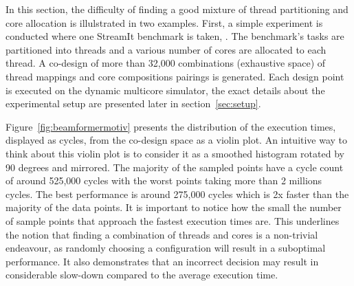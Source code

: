 In this section, the difficulty of finding a good mixture of thread partitioning and core allocation is illulstrated in two examples.
First, a simple experiment is conducted where one StreamIt benchmark is taken, .
The benchmark's tasks are partitioned into threads and a various number of cores are allocated to each thread.
A co-design of more than 32,000 combinations (exhaustive space) of thread mappings and core compositions pairings is generated.
Each design point is executed on the dynamic multicore simulator, the exact details about the experimental setup are presented later in section~\ref{sec:setup}.

Figure~\ref{fig:beamformermotiv} presents the distribution of the execution times, displayed as cycles, from the co-design space as a violin plot.
An intuitive way to think about this violin plot is to consider it as a smoothed histogram rotated by 90 degrees and mirrored.
The majority of the sampled points have a cycle count of around 525,000 cycles with the worst points taking more than 2 millions cycles.
The best performance is around 275,000 cycles which is 2x faster than the majority of the data points.
It is important to notice how the small the number of sample points that approach the fastest execution times are.
This underlines the notion that finding a combination of threads and cores is a non-trivial endeavour, as randomly choosing a configuration will result in a suboptimal performance.
It also demonstrates that an incorrect decision may result in considerable slow-down compared to the average execution time.

